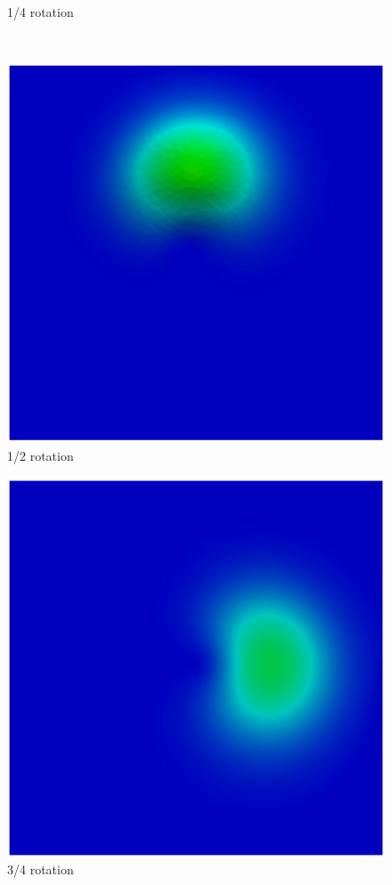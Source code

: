 \begin{frame}
\begin{center}
\begin{figure}[H]
\begin{minipage}{.5\linewidth}
      \tiny 1/4 rotation
     \end{minipage}\\[0.3cm]
     \begin{minipage}{.5\linewidth}
      \centering
      \includegraphics[scale=0.22]{./images/figSLlinear2.png}\\
      \tiny 1/2 rotation
     \end{minipage}%
     \begin{minipage}{.5\linewidth}
      \centering
      \includegraphics[scale=0.22]{./images/figSLlinear3.png}\\
      \tiny 3/4 rotation
     \end{minipage}
\end{figure}
\end{center}
\end{frame} 
